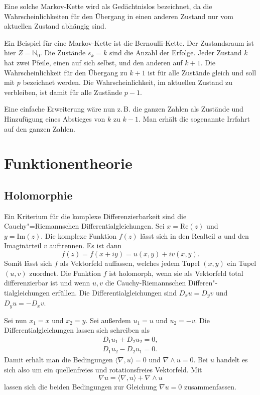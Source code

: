\documentclass[a4paper,10pt,fleqn,twocolumn,twoside]{article}
\begin{document}
Eine solche Markov-Kette wird als Gedächtnislos bezeichnet, da
die Wahrscheinlichkeiten für den Übergang in einen anderen Zustand
nur vom aktuellen Zustand abhängig sind.

Ein Beispiel für eine Markov-Kette ist die Bernoulli-Kette.
Der Zustandsraum ist hier $Z=\mathbb{N}_0$. Die Zustände $s_k=k$
sind die Anzahl der Erfolge. Jeder Zustand $k$ hat zwei Pfeile,
einen auf sich selbst, und den anderen auf $k+1$. Die
Wahrscheinlichkeit für den Übergang zu $k+1$ ist für alle Zustände
gleich und soll mit $p$ bezeichnet werden. Die Wahrscheinlichkeit,
im aktuellen Zustand zu verbleiben, ist damit für alle
Zustände $p-1$.

Eine einfache Erweiterung wäre nun z.\,B. die ganzen Zahlen als
Zustände und Hinzufügung eines Abstieges von $k$ zu $k-1$.
Man erhält die sogenannte Irrfahrt auf den ganzen Zahlen.


\newpage
\section{Funktionentheorie}
\subsection{Holomorphie}

Ein Kriterium für die komplexe Differenzierbarkeit sind die
Cauchy"=Riemannschen Differentialgleichungen. Sei $x=\mathrm{Re}(z)$
und $y=\mathrm{Im}(z)$. Die komplexe Funktion $f(z)$ lässt sich
in den Realteil $u$ und den Imaginärteil $v$ auftrennen. Es ist
dann
\[f(z) = f(x+iy) = u(x,y)+iv(x,y).\]
Somit lässt sich $f$ als Vektorfeld auffassen, welches jedem Tupel
$(x,y)$ ein Tupel $(u,v)$ zuordnet. Die Funktion $f$ ist
holomorph, wenn sie als Vektorfeld total differenzierbar ist und
wenn $u,v$ die Cauchy-Riemannschen Differen"-tialgleichungen
erfüllen. Die Differentialgleichungen sind $D_x u=D_y v$ und
$D_y u = -D_x v$.

Sei nun $x_1=x$ und $x_2=y$. Sei außerdem $u_1=u$
und $u_2=-v$. Die Differentialgleichungen lassen sich schreiben als
\begin{gather*}
D_1u_1+D_2u_2=0,\\
D_1u_2-D_2u_1=0.
\end{gather*}
Damit erhält man die Bedingungen $\langle\nabla,u\rangle=0$ und
$\nabla\wedge u=0$. Bei $u$ handelt es sich also um ein
quellenfreies und rotationsfreies Vektorfeld. Mit
\[\nabla u = \langle\nabla, u\rangle+\nabla\wedge u\]
lassen sich die beiden Bedingungen zur Gleichung $\nabla u=0$
zusammenfassen.
\end{document}
